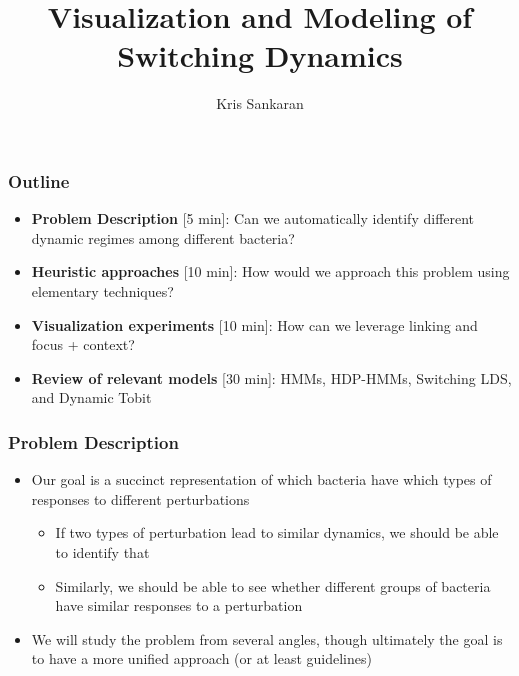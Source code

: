 \documentclass{beamer}
\title{Visualization and Modeling of Switching Dynamics}
\author{Kris Sankaran}
\begin{document}
\begin{frame}
  \titlepage
\end{frame}

\begin{frame}
  \frametitle{Outline}
\begin{itemize}
\item \textbf{Problem Description} [5 min]: Can we automatically identify
  different dynamic regimes among different bacteria?
\item \textbf{Heuristic approaches} [10 min]: How would we approach this problem
  using elementary techniques?
\item \textbf{Visualization experiments} [10 min]: How can we leverage linking
  and focus + context?
\item \textbf{Review of relevant models} [30 min]: HMMs, HDP-HMMs, Switching
  LDS, and Dynamic Tobit
\end{itemize}
\end{frame}

\begin{frame}
  \frametitle{Problem Description}
  \begin{itemize}
  \item Our goal is a succinct representation of which bacteria have which types
    of responses to different perturbations
    \begin{itemize}
    \item If two types of perturbation lead to similar dynamics, we should be able
      to identify that
    \item Similarly, we should be able to see whether different groups of bacteria
      have similar responses to a perturbation
    \end{itemize} 
  \item We will study the problem from several angles, though ultimately the
    goal is to have a more unified approach (or at least guidelines)
  \end{itemize}  
\end{frame}
\end{document}
